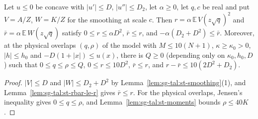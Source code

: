 \begin{lemma}\label{lem:sg-tal:st-rs-parameters}
  \leanok
Let $u\le0$ be concave with $|u'|\le D$, $|u''|\le D_2$, let $\alpha\ge0$, let $q,c$ be real and put
$V=A/Z$, $W=K/Z$ for the smoothing at scale $c$. Then $r=\alpha\,\mathbb E\,V(z\sqrt q)^2$ and
$\bar r=\alpha\,\mathbb E\,W(z\sqrt q)$ satisfy $0\le r\le\alpha D^2$, $\bar r\le r$, and
$-\alpha(D_2+D^2)\le\bar r$. Moreover, at the physical overlaps $(q,\rho)$ of the model with
$M\le10(N+1)$, $\kappa\ge\kappa_0>0$, $|h|\le h_0$ and $-D(1+|x|)\le u(x)$, there is $Q\ge0$
(depending only on $\kappa_0,h_0,D$) such that $0\le q\le\rho\le Q$, $0\le r\le10D^2$, $\bar r\le r$,
and $r-\bar r\le10(2D^2+D_2)$.
\end{lemma}
\begin{proof}
  \leanok
$|V|\le D$ and $|W|\le D_2+D^2$ by Lemma~\ref{lem:sg-tal:st-smoothing}(1), and
Lemma~\ref{lem:sg-tal:st-rbar-le-r} gives $\bar r\le r$. For the physical overlaps, Jensen's
inequality gives $0\le q\le\rho$, and Lemma~\ref{lem:sg-tal:st-moments} bounds $\rho\le 40 K$.
\end{proof}

